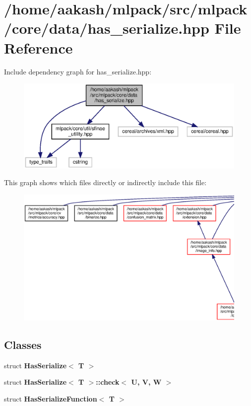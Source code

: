 \section{/home/aakash/mlpack/src/mlpack/core/data/has\+\_\+serialize.hpp File Reference}
\label{has__serialize_8hpp}
Include dependency graph for has\+\_\+serialize.\+hpp\+:
\nopagebreak
\begin{figure}[H]
\begin{center}
\leavevmode
\includegraphics[width=350pt]{has__serialize_8hpp__incl}
\end{center}
\end{figure}
This graph shows which files directly or indirectly include this file\+:
\nopagebreak
\begin{figure}[H]
\begin{center}
\leavevmode
\includegraphics[width=350pt]{has__serialize_8hpp__dep__incl}
\end{center}
\end{figure}
\subsection*{Classes}
\begin{DoxyCompactItemize}
\item 
struct \textbf{ Has\+Serialize$<$ T $>$}
\item 
struct \textbf{ Has\+Serialize$<$ T $>$\+::check$<$ U, V, W $>$}
\item 
struct \textbf{ Has\+Serialize\+Function$<$ T $>$}
\end{DoxyCompactItemize}

